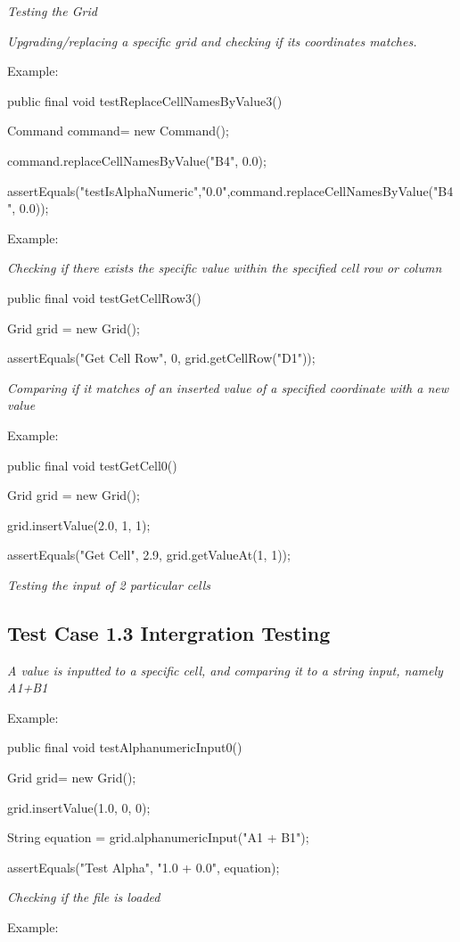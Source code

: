 \documentclass[12pt]{article}
\begin{document}
 {\it Testing the Grid
}

{\it Upgrading/replacing a specific grid and checking if its coordinates matches.
}

Example:


	public final void testReplaceCellNamesByValue3()

	Command command= new Command();

	command.replaceCellNamesByValue("B4", 0.0);

	assertEquals("testIsAlphaNumeric","0.0",command.replaceCellNamesByValue("B4", 0.0));

Example:

{\it Checking if there exists the specific value within the specified cell row or column

}		public final void testGetCellRow3() 

		Grid grid = new Grid();

		assertEquals("Get Cell Row", 0, grid.getCellRow("D1"));

{\it 
 Comparing if it matches of an inserted value of a specified coordinate with a new value }

Example:


	public final void testGetCell0() 

	Grid grid = new Grid();

	grid.insertValue(2.0, 1, 1);

	assertEquals("Get Cell", 2.9, grid.getValueAt(1, 1));

{\it Testing the input of 2 particular cells }

  \subsection{Test Case 1.3  Intergration Testing}
{\it A value is inputted to a specific cell, and comparing it to a string input, namely A1+B1 }

Example:

	public final void testAlphanumericInput0() 

	Grid grid= new Grid();

	grid.insertValue(1.0, 0, 0);

	String equation = grid.alphanumericInput("A1 + B1");

	assertEquals("Test Alpha", "1.0 + 0.0", equation);



{\it Checking if the file is loaded }

Example:
\end{document}

